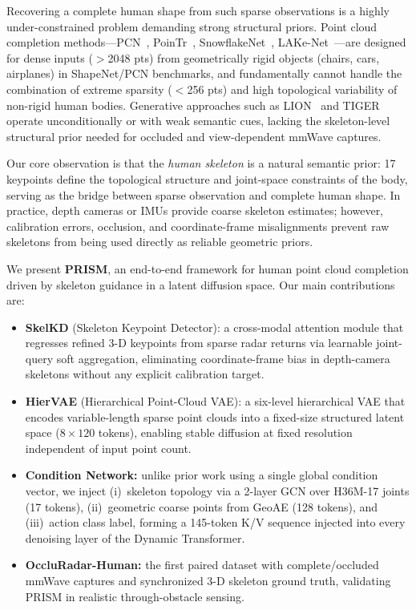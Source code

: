 \documentclass{article}
\begin{document}
Recovering a complete human shape from such sparse observations is a
highly under-constrained problem demanding strong structural priors.
Point cloud completion methods---PCN~\cite{pcn}, PoinTr~\cite{pointr},
SnowflakeNet~\cite{snowflake}, LAKe-Net~\cite{lakenet}---are designed for
dense inputs ($>$2048 pts) from geometrically rigid objects (chairs, cars,
airplanes) in ShapeNet/PCN benchmarks, and fundamentally cannot handle the
combination of extreme sparsity ($<$256 pts) and high topological variability
of non-rigid human bodies.
Generative approaches such as LION~\cite{lion} and TIGER~\cite{tiger} operate
unconditionally or with weak semantic cues, lacking the skeleton-level structural
prior needed for occluded and view-dependent mmWave captures.

Our core observation is that the \emph{human skeleton} is a natural semantic
prior: 17 keypoints define the topological structure and joint-space constraints
of the body, serving as the bridge between sparse observation and complete human
shape.
In practice, depth cameras or IMUs provide coarse skeleton estimates; however,
calibration errors, occlusion, and coordinate-frame misalignments prevent raw
skeletons from being used directly as reliable geometric priors.

We present \textbf{PRISM}, an end-to-end framework for human point cloud
completion driven by skeleton guidance in a latent diffusion space.
Our main contributions are:
\begin{itemize}[leftmargin=1.5em,itemsep=1pt]
  \item \textbf{SkelKD} (Skeleton Keypoint Detector): a cross-modal attention
        module that regresses refined 3-D keypoints from sparse radar returns via
        learnable joint-query soft aggregation, eliminating coordinate-frame bias
        in depth-camera skeletons without any explicit calibration target.
  \item \textbf{HierVAE} (Hierarchical Point-Cloud VAE): a six-level hierarchical
        VAE that encodes variable-length sparse point clouds into a fixed-size
        structured latent space ($8\!\times\!120$ tokens), enabling stable diffusion
        at fixed resolution independent of input point count.
  \item \textbf{Condition Network:} unlike prior work using a single
        global condition vector, we inject (i)~skeleton topology via a 2-layer
        GCN over H36M-17 joints (17 tokens), (ii)~geometric coarse points from
        GeoAE (128 tokens), and (iii)~action class label, forming a
        145-token K/V sequence injected into every denoising layer of the
        Dynamic Transformer.
  \item \textbf{OccluRadar-Human:} the first paired dataset with
        complete/occluded mmWave captures and synchronized 3-D skeleton ground
        truth, validating PRISM in realistic through-obstacle sensing.
\end{itemize}
\end{document}
